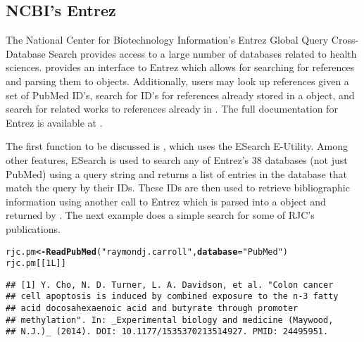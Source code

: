 \documentclass[article]{jss}\usepackage[]{graphicx}\usepackage[]{color}
\makeatletter
\newcommand{\hlnum}[1]{\textcolor[rgb]{0.125,0.125,1}{#1}}%
\newcommand{\hlstr}[1]{\textcolor[rgb]{0.125,0.125,1}{#1}}%
\newcommand{\hlstd}[1]{\textcolor[rgb]{0.251,0.251,0.282}{#1}}%
\newcommand{\hlkwb}[1]{\textcolor[rgb]{0.439,0.251,1}{\textbf{#1}}}%
\newcommand{\hlkwc}[1]{\textcolor[rgb]{0.529,0,0.184}{\textbf{#1}}}%
\newcommand{\hlkwd}[1]{\textcolor[rgb]{0.251,0.251,0.282}{\textbf{#1}}}%
\newenvironment{kframe}{%
 \def\at@end@of@kframe{}%
 \ifinner\ifhmode%
  \def\at@end@of@kframe{\end{minipage}}%
  \begin{minipage}{\columnwidth}%
 \fi\fi%
 \def\FrameCommand##1{\hskip\@totalleftmargin \hskip-\fboxsep
 \colorbox{shadecolor}{##1}\hskip-\fboxsep
     \hskip-\linewidth \hskip-\@totalleftmargin \hskip\columnwidth}%
 \MakeFramed {\advance\hsize-\width
   \@totalleftmargin\z@ \linewidth\hsize
   \@setminipage}}%
 {\par\unskip\endMakeFramed%
 \at@end@of@kframe}
\newenvironment{knitrout}{}{} %
\newcommand{\ourpkg}{\pkg{RefManageR}}
\makeatother
\begin{document}
\subsection{NCBI's Entrez}
The National Center for Biotechnology Information's Entrez Global Query Cross-Database Search provides access to a large number of databases related to health sciences. \ourpkg{} provides an interface to Entrez which allows for searching for references and parsing them to  objects.  Additionally, users may look up references given a set of PubMed ID's, search for ID's for references already stored in a  object, and search for related works to references already in \R{}.  The full documentation for Entrez is available at \citet{entrez}.

The first \ourpkg{} function to be discussed is , which uses the ESearch E-Utility.  Among other features, ESearch is used to search any of Entrez's 38 databases (not just PubMed) using a query string and returns a list of entries in the database that match the query by their IDs. These IDs are then used to retrieve bibliographic information using another call to Entrez which is parsed into a  object and returned by .  The next example does a simple search for some of RJC's publications.
\begin{knitrout}
\color{fgcolor}\begin{kframe}
\begin{alltt}
\hlstd{rjc.pm} \hlkwb{<-} \hlkwd{ReadPubMed}\hlstd{(}\hlstr{"raymond j. carroll"}\hlstd{,} \hlkwc{database} \hlstd{=} \hlstr{"PubMed"}\hlstd{)}
\hlstd{rjc.pm[[}\hlnum{1L}\hlstd{]]}
\end{alltt}
\begin{verbatim}
## [1] Y. Cho, N. D. Turner, L. A. Davidson, et al. "Colon cancer
## cell apoptosis is induced by combined exposure to the n-3 fatty
## acid docosahexaenoic acid and butyrate through promoter
## methylation". In: _Experimental biology and medicine (Maywood,
## N.J.)_ (2014). DOI: 10.1177/1535370213514927. PMID: 24495951.
\end{verbatim}
\end{kframe}
\end{knitrout}
\end{document}
